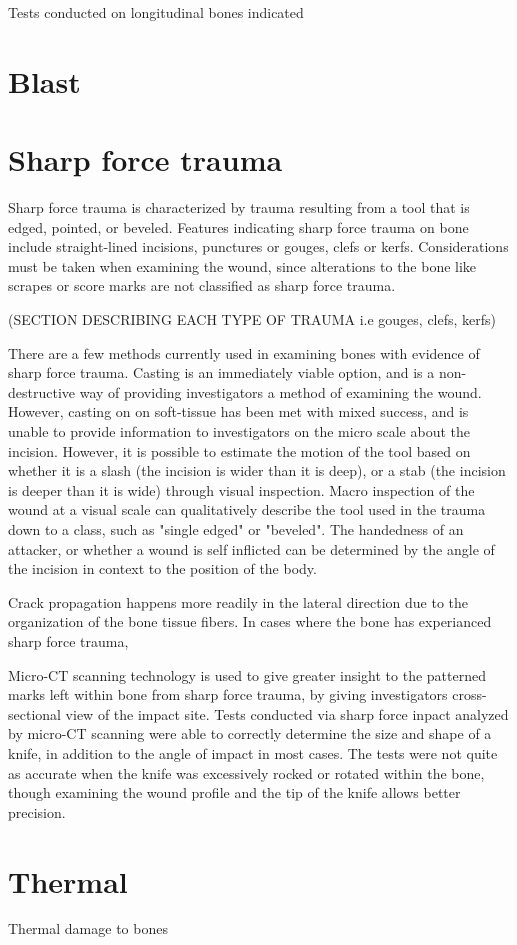 \documentclass[titlepage]{article}
\begin{document}
Tests conducted on longitudinal bones indicated


\newpage
\section{Blast}


\newpage
\section{Sharp force trauma}
Sharp force trauma is characterized by trauma resulting from a tool that is edged, pointed, or beveled. Features indicating sharp force trauma on bone include straight-lined incisions, punctures or gouges, clefs or kerfs. Considerations must be taken when examining the wound, since alterations to the bone like scrapes or score marks are not classified as sharp force trauma. \cite{trauma}



(SECTION DESCRIBING EACH TYPE OF TRAUMA i.e gouges, clefs, kerfs)

There are a few methods currently used in examining bones with evidence of sharp force trauma. Casting is an immediately viable option, and is a non-destructive way of providing investigators a method of examining the wound. However, casting on on soft-tissue has been met with mixed success, and is unable to provide information to investigators on the micro scale about the incision. However, it is possible to estimate the motion of the tool based on whether it is a slash (the incision is wider than it is deep), or a stab (the incision is deeper than it is wide) through visual inspection. \cite{serrated} Macro inspection of the wound at a visual scale can qualitatively describe the tool used in the trauma down to a class, such as "single edged" or "beveled". The handedness of an attacker, or whether a wound is self inflicted can be determined by the angle of the incision in context to the position of the body.

Crack propagation happens more readily in the lateral direction due to the organization of the bone tissue fibers.\cite{mechanics} In cases where the bone has experianced sharp force trauma,


Micro-CT scanning technology is used to give greater insight to the patterned marks left within bone from sharp force trauma, by giving investigators cross-sectional view of the impact site. Tests conducted via sharp force inpact analyzed by micro-CT scanning were able to correctly determine the size and shape of a knife, in addition to the angle of impact in most cases. The tests were not quite as accurate when the knife was excessively rocked or rotated within the bone, though examining the wound profile and the tip of the knife allows better precision.\cite{micro-ct}


\newpage
\section{Thermal}
Thermal damage to bones

\newpage

\end{document}
